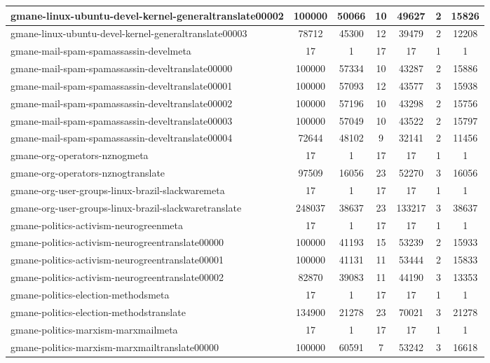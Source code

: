 \begin{table*}[h!]
\begin{center}
\begin{tabular}{| l | c | c | c | c | c | c |}
gmane-linux-ubuntu-devel-kernel-generaltranslate00002 & 100000  & 50066  & 10  & 49627  & 2  & 15826 \\\hline
gmane-linux-ubuntu-devel-kernel-generaltranslate00003 & 78712  & 45300  & 12  & 39479  & 2  & 12208 \\\hline
gmane-mail-spam-spamassassin-develmeta & 17  & 1  & 17  & 17  & 1  & 1 \\\hline
gmane-mail-spam-spamassassin-develtranslate00000 & 100000  & 57334  & 10  & 43287  & 2  & 15886 \\\hline
gmane-mail-spam-spamassassin-develtranslate00001 & 100000  & 57093  & 12  & 43577  & 3  & 15938 \\\hline
gmane-mail-spam-spamassassin-develtranslate00002 & 100000  & 57196  & 10  & 43298  & 2  & 15756 \\\hline
gmane-mail-spam-spamassassin-develtranslate00003 & 100000  & 57049  & 10  & 43522  & 2  & 15797 \\\hline
gmane-mail-spam-spamassassin-develtranslate00004 & 72644  & 48102  & 9  & 32141  & 2  & 11456 \\\hline
gmane-org-operators-nznogmeta & 17  & 1  & 17  & 17  & 1  & 1 \\\hline
gmane-org-operators-nznogtranslate & 97509  & 16056  & 23  & 52270  & 3  & 16056 \\\hline
gmane-org-user-groups-linux-brazil-slackwaremeta & 17  & 1  & 17  & 17  & 1  & 1 \\\hline
gmane-org-user-groups-linux-brazil-slackwaretranslate & 248037  & 38637  & 23  & 133217  & 3  & 38637 \\\hline
gmane-politics-activism-neurogreenmeta & 17  & 1  & 17  & 17  & 1  & 1 \\\hline
gmane-politics-activism-neurogreentranslate00000 & 100000  & 41193  & 15  & 53239  & 2  & 15933 \\\hline
gmane-politics-activism-neurogreentranslate00001 & 100000  & 41131  & 11  & 53444  & 2  & 15833 \\\hline
gmane-politics-activism-neurogreentranslate00002 & 82870  & 39083  & 11  & 44190  & 3  & 13353 \\\hline
gmane-politics-election-methodsmeta & 17  & 1  & 17  & 17  & 1  & 1 \\\hline
gmane-politics-election-methodstranslate & 134900  & 21278  & 23  & 70021  & 3  & 21278 \\\hline
gmane-politics-marxism-marxmailmeta & 17  & 1  & 17  & 17  & 1  & 1 \\\hline
gmane-politics-marxism-marxmailtranslate00000 & 100000  & 60591  & 7  & 53242  & 3  & 16618 \\\hline

\end{tabular}
\end{center}
\end{table*}

